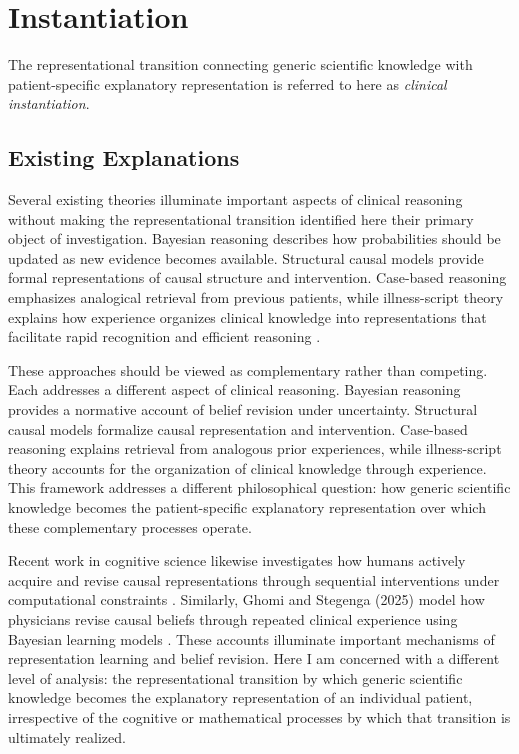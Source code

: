 \documentclass[11pt]{article}
\begin{document}
\section{Instantiation}
The representational transition connecting generic scientific knowledge with patient-specific explanatory representation is referred to here as \emph{clinical instantiation}.

\subsection{Existing Explanations}

Several existing theories illuminate important aspects of clinical reasoning without making the representational transition identified here their primary object of investigation. Bayesian reasoning describes how probabilities should be updated as new evidence becomes available. Structural causal models provide formal representations of causal structure and intervention. Case-based reasoning emphasizes analogical retrieval from previous patients, while illness-script theory explains how experience organizes clinical knowledge into representations that facilitate rapid recognition and efficient reasoning \parencite{elstein_medical_1978,schmidt_cognitive_1990,pearl_causality_2013}.

These approaches should be viewed as complementary rather than competing. Each addresses a different aspect of clinical reasoning. Bayesian reasoning provides a normative account of belief revision under uncertainty. Structural causal models formalize causal representation and intervention. Case-based reasoning explains retrieval from analogous prior experiences, while illness-script theory accounts for the organization of clinical knowledge through experience. This framework addresses a different philosophical question: how generic scientific knowledge becomes the patient-specific explanatory representation over which these complementary processes operate.

Recent work in cognitive science likewise investigates how humans actively acquire and revise causal representations through sequential interventions under computational constraints \parencite{gong_active_2023}. Similarly, Ghomi and Stegenga (2025) model how physicians revise causal beliefs through repeated clinical experience using Bayesian learning models \parencite{tabatabaei_ghomi_causal_2025}. These accounts illuminate important mechanisms of representation learning and belief revision. Here I am concerned with a different level of analysis: the representational transition by which generic scientific knowledge becomes the explanatory representation of an individual patient, irrespective of the cognitive or mathematical processes by which that transition is ultimately realized.
\end{document}
